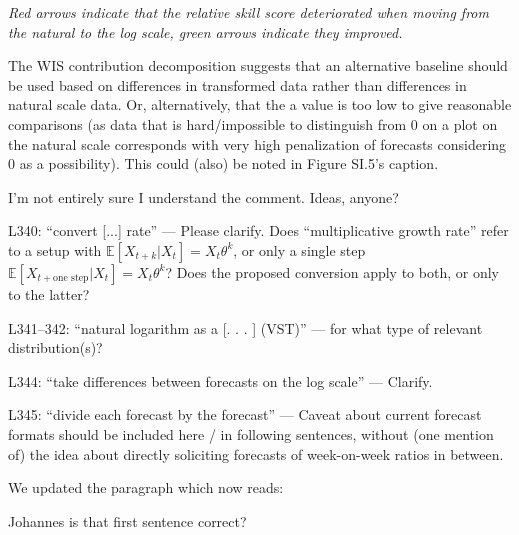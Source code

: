 \documentclass{article}
\newcommand{\red}{\color{red}}
\newcommand{\black}{\color{black}}
\newcommand{\blue}{\color{blue}}
\begin{document}
\textit{Red arrows indicate that the relative skill score deteriorated when moving from the natural to the log scale, green arrows indicate they improved.}

\red
The WIS contribution decomposition suggests that an alternative baseline should be used based on differences in transformed data rather than differences in natural scale data. Or, alternatively, that the a value is too low to give reasonable comparisons (as data that is hard/impossible to distinguish from 0 on a plot on the natural scale corresponds with very high penalization of forecasts considering 0 as a possibility). This could (also) be noted in Figure SI.5’s caption.

\black
I'm not entirely sure I understand the comment. Ideas, anyone? 

\blue
L340: “convert [...] rate” — Please clarify. Does “multiplicative growth rate” refer to a setup with $\mathbb{E}[X_{t+k} | X_t] = X_t \theta^k$, or only a single step $\mathbb{E}[X_{t+\text{one step}} | X_t] = X_t \theta^k$? Does the proposed conversion apply to both, or only to the latter?

\red
L341–342: “natural logarithm as a [. . . ] (VST)” — for what type of relevant distribution(s)?

\blue
L344: “take differences between forecasts on the log scale” — Clarify.

L345: “divide each forecast by the forecast” — Caveat about current forecast formats should be included here / in following sentences, without (one mention of) the idea about directly soliciting forecasts of week-on-week ratios in between.

\black
We updated the paragraph which now reads:

Johannes is that first sentence correct? 
\end{document}
